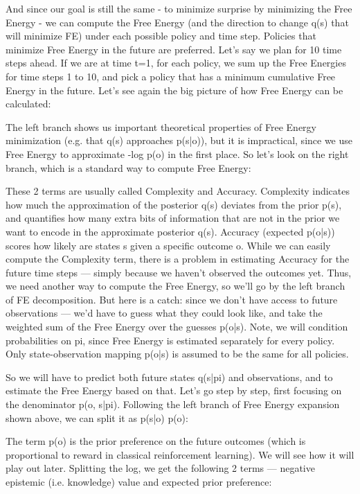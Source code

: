 \documentclass[12pt]{article}
\begin{document}
And since our goal is still the same - to minimize surprise by minimizing the Free Energy - we can compute the Free Energy (and the direction to change q(s) that will minimize FE) under each possible policy and time step.
Policies that minimize Free Energy in the future are preferred. Let's say we plan for 10 time steps ahead. If we are at time t=1, for each policy, we sum up the Free Energies for time steps 1 to 10, and pick a policy that has a minimum cumulative Free Energy in the future. Let's see again the big picture of how Free Energy can be calculated:

The left branch shows us important theoretical properties of Free Energy minimization (e.g. that q(s) approaches p(s|o)), but it is impractical, since we use Free Energy to approximate -log p(o) in the first place. So let's look on the right branch, which is a standard way to compute Free Energy:

These 2 terms are usually called Complexity and Accuracy. Complexity indicates how much the approximation of the posterior q(s) deviates from the prior p(s), and quantifies how many extra bits of information that are not in the prior we want to encode in the approximate posterior q(s). Accuracy (expected p(o|s)) scores how likely are states s given a specific outcome o. While we can easily compute the Complexity term, there is a problem in estimating Accuracy for the future time steps — simply because we haven't observed the outcomes yet. Thus, we need another way to compute the Free Energy, so we'll go by the left branch of FE decomposition. But here is a catch: since we don't have access to future observations — we'd have to guess what they could look like, and take the weighted sum of the Free Energy over the guesses p(o|s). Note, we will condition probabilities on pi, since Free Energy is estimated separately for every policy. Only state-observation mapping p(o|s) is assumed to be the same for all policies.

So we will have to predict both future states q(s|pi) and observations, and to estimate the Free Energy based on that. Let's go step by step, first focusing on the denominator p(o, s|pi). Following the left branch of Free Energy expansion shown above, we can split it as p(s|o) p(o):

The term p(o) is the prior preference on the future outcomes (which is proportional to reward in classical reinforcement learning). We will see how it will play out later. Splitting the log, we get the following 2 terms — negative epistemic (i.e. knowledge) value and expected prior preference:
\end{document}

